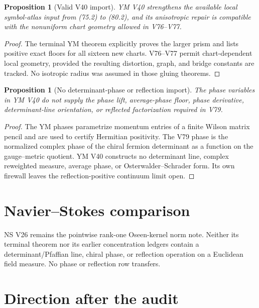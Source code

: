 \documentclass[11pt]{article}
\newtheorem{proposition}[theorem]{Proposition}
\theoremstyle{remark}
\begin{document}
\begin{proposition}[Valid V40 import]
\label{prop:v15v80-valid-import}
YM V40 strengthens the available local symbol-atlas input from
(75.2) to (80.2), and its anisotropic repair is compatible with the
nonuniform chart geometry allowed in V76--V77.
\end{proposition}

\begin{proof}
The terminal YM theorem explicitly proves the larger prism and
lists positive exact floors for all sixteen new charts.  V76--V77
permit chart-dependent local geometry, provided the resulting
distortion, graph, and bridge constants are tracked.  No isotropic
radius was assumed in those gluing theorems.
\end{proof}

\begin{proposition}[No determinant-phase or reflection import]
\label{prop:v15v80-no-phase-import}
The phase variables in YM V40 do not supply the phase lift,
average-phase floor, phase derivative, determinant-line
orientation, or reflected factorization required in V79.
\end{proposition}

\begin{proof}
The YM phases parametrize momentum entries of a finite Wilson
matrix pencil and are used to certify Hermitian positivity.
The V79 phase is the normalized complex phase of the chiral
fermion determinant as a function on the gauge--metric quotient.
YM V40 constructs no determinant line, complex reweighted measure,
average phase, or Osterwalder--Schrader form.  Its own firewall
leaves the reflection-positive continuum limit open.
\end{proof}

\section{Navier--Stokes comparison}

NS V26 remains the pointwise rank-one Oseen-kernel norm note.
Neither its terminal theorem nor its earlier concentration ledgers
contain a determinant/Pfaffian line, chiral phase, or reflection
operation on a Euclidean field measure.  No phase or reflection
row transfers.

\section{Direction after the audit}
\end{document}
